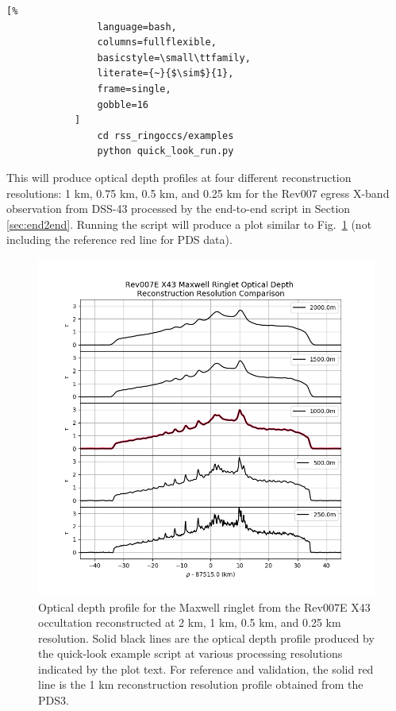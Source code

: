 \documentclass[titlepage, 12pt]{article}
\begin{document}
            \begin{lstlisting}[%
                language=bash,
                columns=fullflexible,
                basicstyle=\small\ttfamily,
                literate={~}{$\sim$}{1},
                frame=single,
                gobble=16
            ]
                cd rss_ringoccs/examples
                python quick_look_run.py
            \end{lstlisting}
            This will produce optical depth profiles at four different
            reconstruction resolutions: 1 km, 0.75 km, 0.5 km, and 0.25 km
            for the Rev007 egress X-band observation from DSS-43 processed by the
            end-to-end script in Section \ref{sec:end2end}. Running the
            script will produce a plot similar to Fig.~\ref{fig:maxwell_multi_res} (not including the reference red line for PDS data).
            \begin{figure}[!ht]
                \includegraphics[width=\textwidth]
                    {figs/quicklook_tau.png}
                \caption[Rev007E Maxwell ringlet at different resolutions]
                    {%
                     Optical depth profile for the Maxwell ringlet from
                     the Rev007E X43 occultation reconstructed at 2 km,
                     1 km, 0.5 km, and 0.25 km resolution. Solid black lines
                     are the optical depth profile produced by the quick-look
                     example script at various processing resolutions indicated
                     by the plot text. For reference and validation, the solid
                     red line is the 1 km reconstruction resolution profile
                     obtained from the PDS3.%
                    }
                \label{fig:maxwell_multi_res}
            \end{figure}
\end{document}
